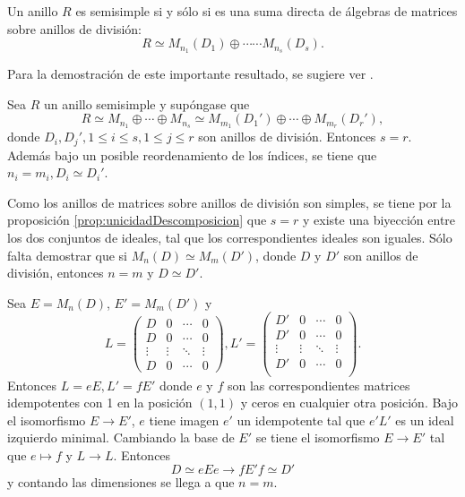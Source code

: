 \begin{teorema}
Un anillo $R$ es semisimple si y sólo si es una suma directa de álgebras de matrices sobre anillos de división:
\[ R \simeq M_{n_1}(D_1)\oplus \cdots \cdots M_{n_s}(D_s).  \]
\end{teorema}
Para la demostración de este importante resultado, se sugiere ver \cite[200]{bib:AlgebraPostGrado}.
\begin{teorema}
Sea $R$ un anillo semisimple y supóngase que 
\[ R \simeq M_{n_1} \oplus \cdots \oplus M_{n_s} \simeq M_{m_1}(D_1')\oplus \cdots \oplus M_{m_r}(D_r'), \] donde $D_i, D_j', 1 \leq i \leq s, 1 \leq j \leq r$ son anillos de división. Entonces $s = r$. Además bajo un posible reordenamiento de los índices, se tiene que $n_i = m_i, D_i \simeq D_i'$. 
\end{teorema} \newpage
\begin{proof*}
Como los anillos de matrices sobre anillos de división son simples, se tiene por la proposición \ref{prop:unicidadDescomposicion} que $s = r$ y existe una biyección entre los dos conjuntos de ideales, tal que los correspondientes ideales son iguales. Sólo falta demostrar que si $M_n(D)\simeq M_m(D')$, donde $D$ y $D'$ son anillos de división, entonces $n = m$ y $D \simeq D'$.

Sea $E = M_n(D)$, $E' = M_m(D')$ y 
\[ L = \begin{pmatrix} 
D &  0 & \cdots & 0 \\
D &  0 & \cdots & 0 \\
\vdots &\vdots& \ddots &\vdots \\
 D &  0 & \cdots & 0
\end{pmatrix} , L'=\begin{pmatrix}
D' & 0 & \cdots & 0\\
D' & 0 & \cdots & 0\\
\vdots &\vdots& \ddots &\vdots \\
D' & 0 & \cdots & 0\\
\end{pmatrix}.\]
\indent Entonces $L = eE, L'= fE'$ donde $e$ y $f$ son las correspondientes matrices idempotentes con 1 en la posición $(1,1)$ y ceros en cualquier otra posición. Bajo el isomorfismo $E \to E'$, $e$ tiene imagen $e'$ un idempotente tal que $e'L'$ es un ideal izquierdo minimal. Cambiando la base de $E'$ se tiene el isomorfismo $E \to E'$ tal que $e \mapsto f$ y $L \to L$. Entonces \[ D \simeq eEe \to fE'f \simeq D' \] y contando las dimensiones se llega a que $n = m$.  
\end{proof*}
